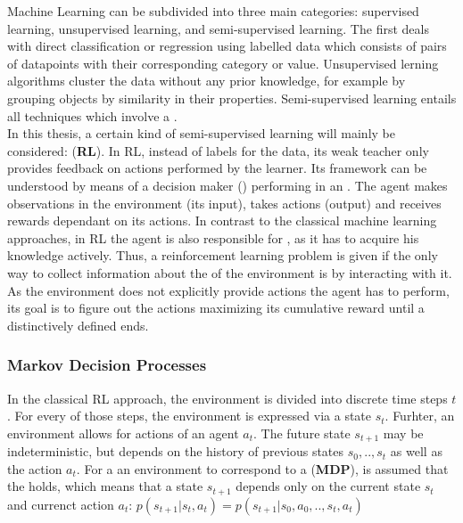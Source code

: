 Machine Learning can be subdivided into three main categories: supervised learning, unsupervised learning, and semi-supervised learning. The first deals with direct classification or regression using labelled data which consists of pairs of datapoints with their corresponding category or value. Unsupervised lerning algorithms cluster the data without any prior knowledge, for example by grouping objects by similarity in their properties. Semi-supervised learning entails all techniques which involve a .\\
In this thesis, a certain kind of semi-supervised learning will mainly be considered:  (\textbf{RL}). In RL, instead of labels for the data, its weak teacher only provides feedback on actions performed by the learner. Its framework can be understood by means of a decision maker () performing in an . The agent makes observations in the environment (its input), takes actions (output) and receives rewards dependant on its actions. In contrast to the classical machine learning approaches, in RL the agent is also responsible for , as it has to acquire his knowledge actively. Thus, a reinforcement learning problem is given if the only way to collect information about the  of the environment is by interacting with it. As the environment does not explicitly provide actions the agent has to perform, its goal is to figure out the actions maximizing its cumulative reward until a distinctively defined  ends.

\subsubsection{Markov Decision Processes} \label{ch:mdps}

In the classical RL approach, the environment is divided into discrete time steps $t$. For every of those steps, the environment is expressed via a state $s_t$. Furhter, an environment allows for actions of an agent $a_t$. The future state $s_{t+1}$ may be indeterministic, but depends on the history of previous states $s_0, .., s_t$ as well as the action $a_t$. For a an environment to correspond to a  (\textbf{MDP}), is assumed that the  holds, which means that  a state  $s_{t+1}$ depends only on the current state $s_t$ and currenct action $a_t$: $p(s_{t+1}|s_t,a_t) = p(s_{t+1}|s_0,a_0,..,s_t,a_t)$

